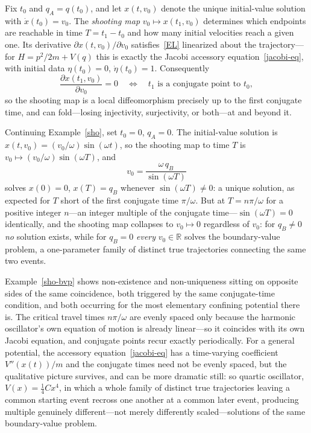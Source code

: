 Fix $t_0$ and $q_A=q(t_0)$, and let $x(t,v_0)$ denote the unique initial-value
solution with $\dot x(t_0)=v_0$. The \emph{shooting map} $v_0\mapsto
x(t_1,v_0)$ determines which endpoints are reachable in time $T=t_1-t_0$ and
how many initial velocities reach a given one. Its derivative $\partial
x(t,v_0)/\partial v_0$ satisfies~\eqref{EL} linearized about the
trajectory---for $H=p^2/2m+V(q)$ this is exactly the Jacobi accessory
equation~\eqref{jacobi-eq}, with initial data $\eta(t_0)=0$, $\dot\eta(t_0)=1$.
Consequently
\begin{equation}
\frac{\partial x(t_1,v_0)}{\partial v_0} = 0
    \quad\Longleftrightarrow\quad t_1 \text{ is a conjugate point to } t_0 ,
\end{equation}
so the shooting map is a local diffeomorphism precisely up to the first
conjugate time, and can fold---losing injectivity, surjectivity, or both---at
and beyond it.

\begin{example}
\label{sho-bvp}
Continuing Example~\ref{sho}, set $t_0=0$, $q_A=0$. The initial-value solution
    is $x(t,v_0)=(v_0/\omega)\sin(\omega t)$, so the shooting map to time $T$
    is $v_0\mapsto (v_0/\omega)\sin(\omega T)$, and
\begin{equation}
v_0 = \frac{\omega\, q_B}{\sin(\omega T)}
\end{equation}
solves $x(0)=0$, $x(T)=q_B$ whenever $\sin(\omega T)\neq0$: a unique solution,
    as expected for $T$ short of the first conjugate time $\pi/\omega$. But at
    $T=n\pi/\omega$ for a positive integer $n$---an integer multiple of the
    conjugate time---$\sin(\omega T)=0$ identically, and the shooting map
    collapses to $v_0\mapsto 0$ regardless of $v_0$: for $q_B\neq0$ \emph{no}
    solution exists, while for $q_B=0$ \emph{every} $v_0\in\mathbb{R}$ solves
    the boundary-value problem, a one-parameter family of distinct true
    trajectories connecting the same two events.
\end{example}

Example~\ref{sho-bvp} shows non-existence and non-uniqueness sitting on
opposite sides of the same coincidence, both triggered by the same
conjugate-time condition, and both occurring for the most elementary confining
potential there is. The critical travel times $n\pi/\omega$ are evenly spaced
only because the harmonic oscillator's own equation of motion is already
linear---so it coincides with its own Jacobi equation, and conjugate points
recur exactly periodically. For a general potential, the accessory
equation~\eqref{jacobi-eq} has a time-varying coefficient $V''(x(t))/m$ and the
conjugate times need not be evenly spaced, but the qualitative picture
survives, and can be more dramatic still: so quartic
oscillator, $V(x)=\tfrac14 Cx^4$, in which a whole family of distinct true
trajectories leaving a common starting event recross one another at a common
later event, producing multiple genuinely different---not merely differently
scaled---solutions of the same boundary-value problem.

